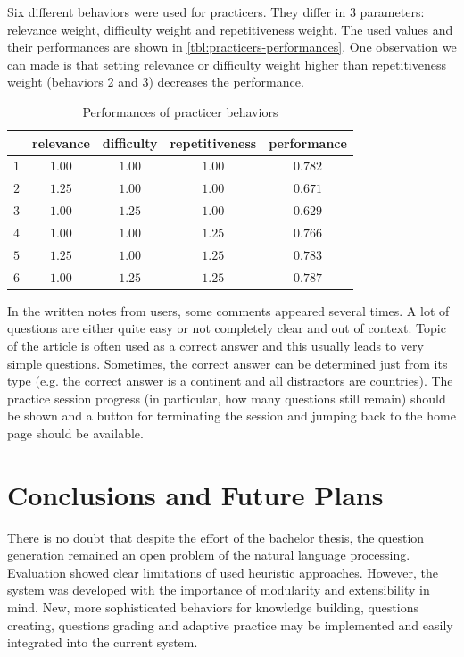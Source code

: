 \documentclass[12pt, twoside]{fithesis2}
\renewcommand{\_}{\leavevmode \kern0.07em\vbox{\hrule width0.4em}}
\begin{document}
Six different behaviors were used for practicers.
They differ in 3 parameters: relevance weight, difficulty weight and repetitiveness weight.
The used values and their performances are shown in \autoref{tbl:practicers-performances}.
One observation we can made is that setting relevance or difficulty weight higher than repetitiveness weight (behaviors 2 and 3) decreases the performance.

\begin{table}[h]
\begin{center}
\begin{tabular}{| c | c  c  c | c |}
  \hline
      & relevance & difficulty & repetitiveness & performance\\
  \hline
  $1$ & $1.00$ & $1.00$ & $1.00$ & $0.782$\\
  $2$ & $1.25$ & $1.00$ & $1.00$ & $0.671$\\
  $3$ & $1.00$ & $1.25$ & $1.00$ & $0.629$\\
  $4$ & $1.00$ & $1.00$ & $1.25$ & $0.766$\\
  $5$ & $1.25$ & $1.00$ & $1.25$ & $0.783$\\
  $6$ & $1.00$ & $1.25$ & $1.25$ & $0.787$\\
  \hline
\end{tabular}
\end{center}
\caption{Performances of practicer behaviors}
\label{tbl:practicers-performances}
\end{table}

In the written notes from users, some comments appeared several times.
A lot of questions are either quite easy or not completely clear and out of context.
Topic of the article is often used as a correct answer and this usually leads to very simple questions.
Sometimes, the correct answer can be determined just from its type
(e.g. the correct answer is a continent and all distractors are countries).
The practice session progress (in particular, how many questions still remain) should be shown
and a button for terminating the session and jumping back to the home page should be available.



\chapter{Conclusions and Future Plans}
\label{chap:future}

There is no doubt that despite the effort of the bachelor thesis,
the question generation remained an open problem of the natural language processing.
Evaluation showed clear limitations of used heuristic approaches.
However, the system was developed with the importance of modularity and extensibility in mind.
New, more sophisticated behaviors for knowledge building, questions creating, questions grading and adaptive practice may be implemented and easily integrated into the current system.
\end{document}
